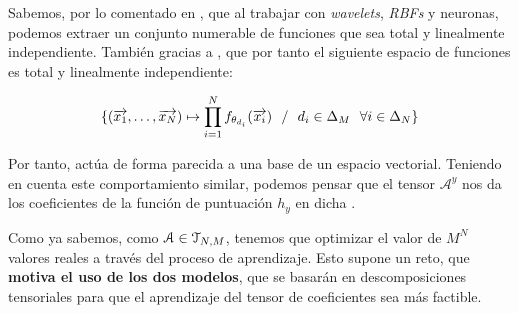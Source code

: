 \begin{observacion}
    Sabemos, por lo comentado en , que al trabajar con \textit{wavelets}, \textit{RBFs} y neuronas, podemos extraer un conjunto numerable de funciones que sea total y linealmente independiente. También gracias a , que por tanto el siguiente espacio de funciones es total y linealmente independiente:

    $$\{(\overrightarrow{x_1}, \ldots, \overrightarrow{x_N}) \mapsto \prod_{i = 1}^{N} f_{\theta_{d_i}} (\overrightarrow{x_i}) \ \  / \ \  d_i \in \Delta_{M} \ \  \forall i \in \Delta_{N}\}$$

    Por tanto, actúa de forma parecida a una base de un espacio vectorial. Teniendo en cuenta este comportamiento similar, podemos pensar que el tensor $\mathcal{A}^y$ nos da los coeficientes de la función de puntuación $h_y$ en dicha .

\end{observacion}

\begin{observacion}
    Como ya sabemos, como $\mathcal{A} \in \mathcal{T}_{N, M}$, tenemos que optimizar el valor de $M^N$ valores reales a través del proceso de aprendizaje. Esto supone un reto, que \textbf{motiva el uso de los dos modelos}, que se basarán en descomposiciones tensoriales para que el aprendizaje del tensor de coeficientes sea más factible.
\end{observacion}

